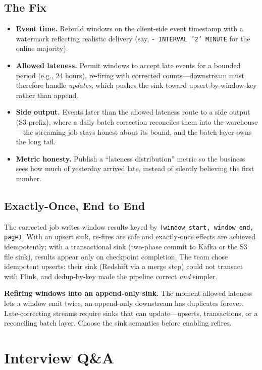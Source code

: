 \subsection{The Fix}
\begin{itemize}
    \item \textbf{Event time.} Rebuild windows on the client-side event timestamp with a watermark reflecting realistic delivery (say, \texttt{- INTERVAL '2' MINUTE} for the online majority).
    \item \textbf{Allowed lateness.} Permit windows to accept late events for a bounded period (e.g., 24 hours), re-firing with corrected counts---downstream must therefore handle \emph{updates}, which pushes the sink toward upsert-by-window-key rather than append.
    \item \textbf{Side output.} Events later than the allowed lateness route to a side output (S3 prefix), where a daily batch correction reconciles them into the warehouse---the streaming job stays honest about its bound, and the batch layer owns the long tail.
    \item \textbf{Metric honesty.} Publish a ``lateness distribution'' metric so the business sees how much of yesterday arrived late, instead of silently believing the first number.
\end{itemize}

\subsection{Exactly-Once, End to End}
The corrected job writes window results keyed by \texttt{(window\_start, window\_end, page)}. With an upsert sink, re-fires are safe and exactly-once effects are achieved idempotently; with a transactional sink (two-phase commit to Kafka or the S3 file sink), results appear only on checkpoint completion. The team chose idempotent upserts: their sink (Redshift via a merge step) could not transact with Flink, and dedup-by-key made the pipeline correct \emph{and} simpler.

\begin{pitfall}
\textbf{Refiring windows into an append-only sink.} The moment allowed lateness lets a window emit twice, an append-only downstream has duplicates forever. Late-correcting streams require sinks that can update---upserts, transactions, or a reconciling batch layer. Choose the sink semantics before enabling refires.
\end{pitfall}

\section{Interview Q\&A}
